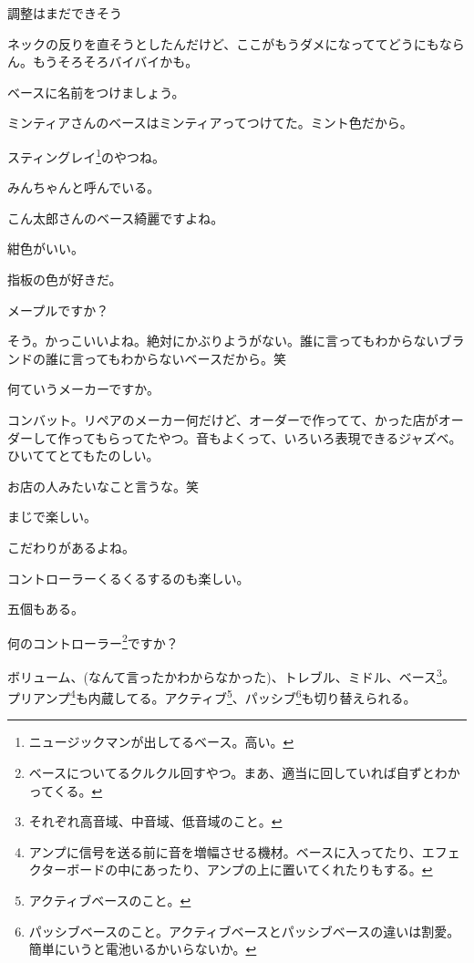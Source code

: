 \begin{multicols}{3}
調整はまだできそう

ネックの反りを直そうとしたんだけど、ここがもうダメになっててどうにもならん。もうそろそろバイバイかも。

ベースに名前をつけましょう。

ミンティアさんのベースはミンティアってつけてた。ミント色だから。

スティングレイ\footnote{ニュージックマンが出してるベース。高い。}のやつね。

みんちゃんと呼んでいる。

こん太郎さんのベース綺麗ですよね。

紺色がいい。

指板の色が好きだ。

メープルですか？

そう。かっこいいよね。絶対にかぶりようがない。誰に言ってもわからないブランドの誰に言ってもわからないベースだから。笑

何ていうメーカーですか。

コンバット。リペアのメーカー何だけど、オーダーで作ってて、かった店がオーダーして作ってもらってたやつ。音もよくって、いろいろ表現できるジャズベ。ひいててとてもたのしい。

お店の人みたいなこと言うな。笑

まじで楽しい。

こだわりがあるよね。

コントローラーくるくるするのも楽しい。

五個もある。

何のコントローラー\footnote{ベースについてるクルクル回すやつ。まあ、適当に回していれば自ずとわかってくる。}ですか？

ボリューム、(なんて言ったかわからなかった)、トレブル、ミドル、ベース\footnote{それぞれ高音域、中音域、低音域のこと。}。プリアンプ\footnote{アンプに信号を送る前に音を増幅させる機材。ベースに入ってたり、エフェクターボードの中にあったり、アンプの上に置いてくれたりもする。}も内蔵してる。アクティブ\footnote{アクティブベースのこと。}、パッシブ\footnote{パッシブベースのこと。アクティブベースとパッシブベースの違いは割愛。簡単にいうと電池いるかいらないか。}も切り替えられる。


\end{multicols}
